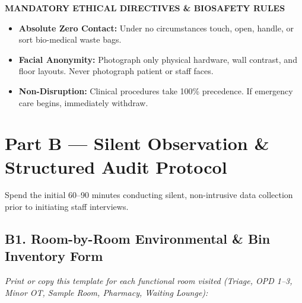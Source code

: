 \documentclass[11pt,a4paper]{article}
\begin{document}
\begin{alertbox}
\noindent\textbf{\color{alertred} MANDATORY ETHICAL DIRECTIVES \& BIOSAFETY RULES}
\begin{itemize}[leftmargin=*, nosep]
    \item \textbf{Absolute Zero Contact:} Under no circumstances touch, open, handle, or sort bio-medical waste bags.
    \item \textbf{Facial Anonymity:} Photograph only physical hardware, wall contrast, and floor layouts. Never photograph patient or staff faces.
    \item \textbf{Non-Disruption:} Clinical procedures take 100\% precedence. If emergency care begins, immediately withdraw.
\end{itemize}
\end{alertbox}

\section{Part B --- Silent Observation \& Structured Audit Protocol}

Spend the initial 60--90 minutes conducting silent, non-intrusive data collection prior to initiating staff interviews.

\subsection{B1. Room-by-Room Environmental \& Bin Inventory Form}
\emph{Print or copy this template for each functional room visited (Triage, OPD 1--3, Minor OT, Sample Room, Pharmacy, Waiting Lounge):}
\end{document}
